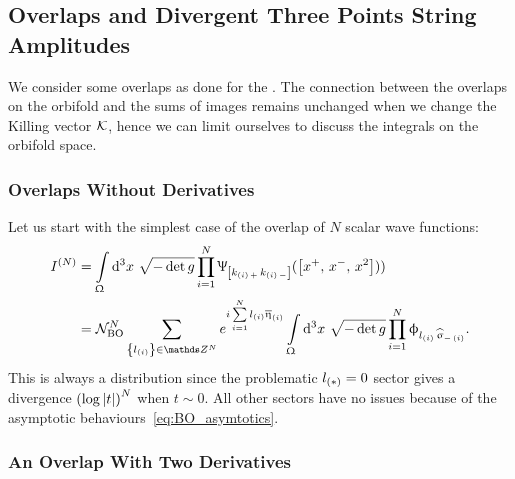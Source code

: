 \subsection{Overlaps and Divergent Three Points String Amplitudes}
\label{sec:BOoverlap}

We consider some overlaps as done for the \nbo.
The connection between the overlaps on the orbifold and the sums of images remains unchanged when we change the Killing vector $\mathcal{K}$, hence we can limit ourselves to discuss the integrals on the orbifold space.  


\subsubsection{Overlaps Without Derivatives}

Let us start with the simplest case of the overlap of $N$ scalar wave functions:
\begin{equation}
  \begin{split}
    I^{(N)}
    & =
    \int\limits_{\Omega} \dd[3]{x}\,
    \sqrt{- \det g}
    \finiteprod{i}{1}{N}
    \Psi_{\qty[k_{\qty(i)\, +}\, k_{\qty(i)\, -}]}(\qty[x^+,\, x^-,\, x^2]))
    \\
    & =
    \cN_{\text{BO}}^N
    \sum_{ \qty{l_{\qty(i)} } \in \Z^N } 
    e^{i \finitesum{i}{1}{N} l_{\qty(i)} \beta_{(i)} }
    \int\limits_{\Omega} \dd[3]{x}\,
    \sqrt{-\det g}
    \finiteprod{i}{1}{N} \phi_{\lsiN{i}}.
  \end{split}
\end{equation}
This is always a distribution since the problematic $l_{\qty(*)} = 0$ sector gives a divergence $\qty(\log\abs{t})^N$ when $t \sim 0$.
All other sectors have no issues because of the asymptotic behaviours~\eqref{eq:BO_asymtotics}. 


\subsubsection{An Overlap With Two Derivatives}

